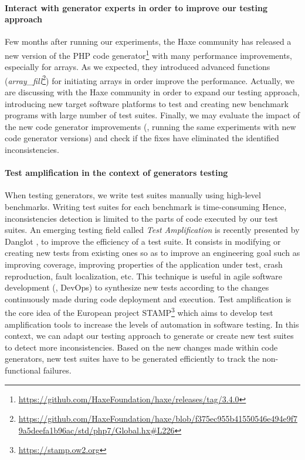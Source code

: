\paragraph{Interact with generator experts in order to improve our testing approach}
Few months after running our experiments, the Haxe community has released a new version of the PHP code generator\footnote{\url{https://github.com/HaxeFoundation/haxe/releases/tag/3.4.0}} with many performance improvements, especially for arrays. As we expected, they introduced advanced functions (\textit{array\_fill}\footnote{\url{https://github.com/HaxeFoundation/haxe/blob/f375ec955b41550546e494e9f79a5deefa1b96ac/std/php7/Global.hx\#L226}}) for initiating arrays in order improve the performance. Actually, we are discussing with the Haxe community in order to expand our testing approach, introducing new target software platforms to test and creating new benchmark programs with large number of test suites. Finally, we may evaluate the impact of the new code generator improvements (\ie, running the same experiments with new code generator versions) and check if the fixes have eliminated the identified inconsistencies.

\paragraph{Test amplification in the context of generators testing}
When testing generators, we write test suites manually using high-level benchmarks. 
Writing test suites for each benchmark is time-consuming
Hence, inconsistencies detection is limited to the parts of code executed by our test suites. An emerging testing field called \textit{Test Amplification} is recently presented by Danglot \etal \cite{danglot2017emerging}, to improve the efficiency of a test suite. It consists in modifying or creating new tests from existing ones so as to improve an engineering goal such as improving coverage, improving properties of the application under test, crash reproduction, fault localization, etc. This technique is useful in agile software development (\ie, DevOps) to synthesize new tests according to the changes continuously made during code deployment and execution. Test amplification is the core idea of the European project STAMP\footnote{\url{https://stamp.ow2.org}} which aims to develop test amplification tools to increase the levels of automation in software testing.
In this context, we can adapt our testing approach to generate or create new test suites to detect more inconsistencies. Based on the new changes made within code generators, new test suites have to be generated efficiently to track the non-functional failures.


